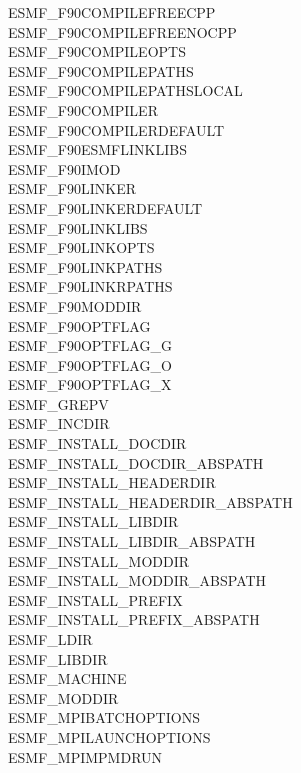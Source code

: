 \begin{description}
\item[ESMF\_F90COMPILEFREECPP]
\item[ESMF\_F90COMPILEFREENOCPP]
\item[ESMF\_F90COMPILEOPTS]
\item[ESMF\_F90COMPILEPATHS]
\item[ESMF\_F90COMPILEPATHSLOCAL]
\item[ESMF\_F90COMPILER]
\item[ESMF\_F90COMPILERDEFAULT]
\item[ESMF\_F90ESMFLINKLIBS]
\item[ESMF\_F90IMOD]
\item[ESMF\_F90LINKER]
\item[ESMF\_F90LINKERDEFAULT]
\item[ESMF\_F90LINKLIBS]
\item[ESMF\_F90LINKOPTS]
\item[ESMF\_F90LINKPATHS]
\item[ESMF\_F90LINKRPATHS]
\item[ESMF\_F90MODDIR]
\item[ESMF\_F90OPTFLAG]
\item[ESMF\_F90OPTFLAG\_G]
\item[ESMF\_F90OPTFLAG\_O]
\item[ESMF\_F90OPTFLAG\_X]
\item[ESMF\_GREPV]
\item[ESMF\_INCDIR]
\item[ESMF\_INSTALL\_DOCDIR]
\item[ESMF\_INSTALL\_DOCDIR\_ABSPATH]
\item[ESMF\_INSTALL\_HEADERDIR]
\item[ESMF\_INSTALL\_HEADERDIR\_ABSPATH]
\item[ESMF\_INSTALL\_LIBDIR]
\item[ESMF\_INSTALL\_LIBDIR\_ABSPATH]
\item[ESMF\_INSTALL\_MODDIR]
\item[ESMF\_INSTALL\_MODDIR\_ABSPATH]
\item[ESMF\_INSTALL\_PREFIX]
\item[ESMF\_INSTALL\_PREFIX\_ABSPATH]
\item[ESMF\_LDIR]
\item[ESMF\_LIBDIR]
\item[ESMF\_MACHINE]
\item[ESMF\_MODDIR]
\item[ESMF\_MPIBATCHOPTIONS]
\item[ESMF\_MPILAUNCHOPTIONS]
\item[ESMF\_MPIMPMDRUN]

\end{description}
